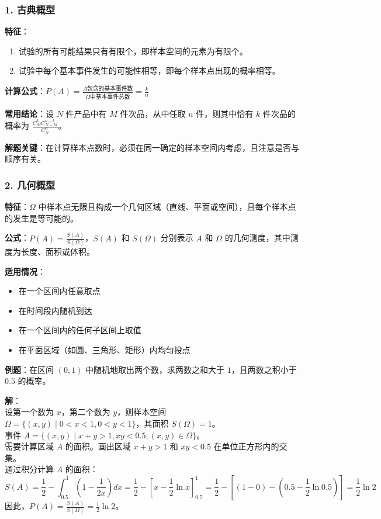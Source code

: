 \documentclass[12pt,a4paper]{ctexart}
\begin{document}
\subsubsection{1. 古典概型}
\textbf{特征}：
\begin{enumerate}[noitemsep]
    \item 试验的所有可能结果只有有限个，即样本空间的元素为有限个。
    \item 试验中每个基本事件发生的可能性相等，即每个样本点出现的概率相等。
\end{enumerate}

\textbf{计算公式}：$P(A) = \frac{A\text{包含的基本事件数}}{\Omega\text{中基本事件总数}} = \frac{k}{n}$

\textbf{常用结论}：设 $N$ 件产品中有 $M$ 件次品，从中任取 $n$ 件，则其中恰有 $k$ 件次品的概率为 $\frac{C_M^k C_{N-M}^{n-k}}{C_N^n}$。

\textbf{解题关键}：在计算样本点数时，必须在同一确定的样本空间内考虑，且注意是否与顺序有关。

\subsubsection{2. 几何概型}
\textbf{特征}：$\Omega$ 中样本点无限且构成一个几何区域（直线、平面或空间），且每个样本点的发生是等可能的。

\textbf{公式}：$P(A) = \frac{S(A)}{S(\Omega)}$，$S(A)$ 和 $S(\Omega)$ 分别表示 $A$ 和 $\Omega$ 的几何测度，其中测度为长度、面积或体积。

\textbf{适用情况}：
\begin{itemize}[noitemsep]
    \item 在一个区间内任意取点
    \item 在时间段内随机到达
    \item 在一个区间内的任何子区间上取值
    \item 在平面区域（如圆、三角形、矩形）内均匀投点
\end{itemize}

\textbf{例题}：在区间 $(0,1)$ 中随机地取出两个数，求两数之和大于 $1$，且两数之积小于 $0.5$ 的概率。

\textbf{解}：\\
设第一个数为 $x$，第二个数为 $y$，则样本空间 $\Omega = \{(x,y) \mid 0 < x < 1, 0 < y < 1\}$，其面积 $S(\Omega) = 1$。\\
事件 $A = \{(x,y) \mid x+y > 1, xy < 0.5, (x,y) \in \Omega\}$。\\
需要计算区域 $A$ 的面积。画出区域 $x+y>1$ 和 $xy<0.5$ 在单位正方形内的交集。\\
通过积分计算 $A$ 的面积：\\
\[
    S(A) = \frac{1}{2} - \int_{0.5}^{1} \left(1 - \frac{1}{2x}\right) dx = \frac{1}{2} - \left[x - \frac{1}{2}\ln x\right]_{0.5}^{1} = \frac{1}{2} - \left[(1-0) - \left(0.5 - \frac{1}{2}\ln 0.5\right)\right] = \frac{1}{2} \ln 2
\]
因此，$P(A) = \frac{S(A)}{S(\Omega)} = \boxed{\frac{1}{2}\ln 2}$。
\end{document}

